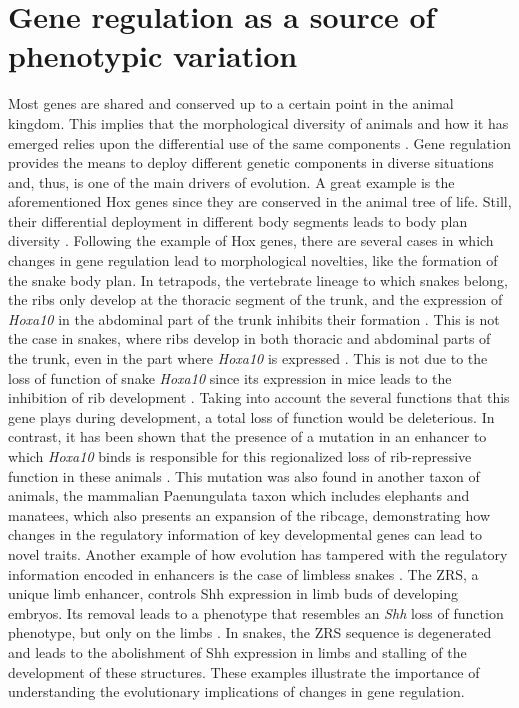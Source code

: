 \section{Gene regulation as a source of phenotypic variation}


Most genes are shared and conserved up to a certain point in the animal kingdom. This implies that the morphological diversity of animals and how it has emerged relies upon the differential use of the same components \parencite{duboule_evolution_1998}. Gene regulation provides the means to deploy different genetic components in diverse situations and, thus, is one of the main drivers of evolution. A great example is the aforementioned Hox genes since they are conserved in the animal tree of life. Still, their differential deployment in different body segments leads to body plan diversity \parencite{mallo_reassessing_2018, turetzek_hox_2022}. Following the example of Hox genes, there are several cases in which changes in gene regulation lead to morphological novelties, like the formation of the snake body plan. In tetrapods, the vertebrate lineage to which snakes belong, the ribs only develop at the thoracic segment of the trunk, and the expression of \textit{Hoxa10} in the abdominal part of the trunk inhibits their formation \parencite{wellik_hox10_2003}. This is not the case in snakes, where ribs develop in both thoracic and abdominal parts of the trunk, even in the part where \textit{Hoxa10} is expressed \parencite{woltering_axial_2009}. This is not due to the loss of function of snake \textit{Hoxa10} since its expression in mice leads to the inhibition of rib development \parencite{guerreiro_role_2013}. Taking into account the several functions that this gene plays during development, a total loss of function would be deleterious. In contrast, it has been shown that the presence of a mutation in an enhancer to which \textit{Hoxa10} binds is responsible for this regionalized loss of rib-repressive function in these animals \parencite{guerreiro_role_2013}. This mutation was also found in another taxon of animals, the mammalian Paenungulata taxon which includes elephants and manatees, which also presents an expansion of the ribcage, demonstrating how changes in the regulatory information of key developmental genes can lead to novel traits. Another example of how evolution has tampered with the regulatory information encoded in enhancers is the case of limbless snakes \parencite{leal_loss_2016, kvon_progressive_2016, leal_developmental_2018}. The ZRS, a unique limb enhancer, controls Shh expression in limb buds of developing embryos. Its removal leads to a phenotype that resembles an \textit{Shh} loss of function phenotype, but only on the limbs \parencite{sagai_elimination_2005}. In snakes, the ZRS sequence is degenerated and leads to the abolishment of Shh expression in limbs and stalling of the development of these structures. These examples illustrate the importance of understanding the evolutionary implications of changes in gene regulation.


